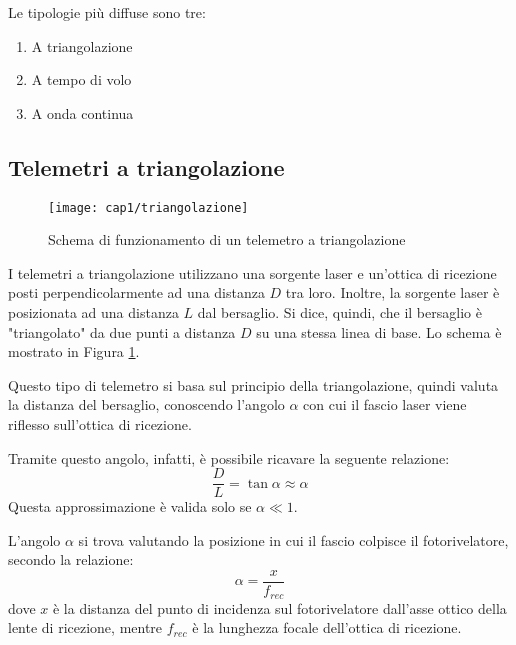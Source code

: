 Le tipologie più diffuse sono tre: 
\begin{enumerate}
	\item A triangolazione
	\item A tempo di volo
	\item A onda continua
\end{enumerate}

\subsection{Telemetri a triangolazione}
\begin{figure}[H]
  \begin{center}
    \texttt{[image: cap1/triangolazione]}
    \caption{Schema di funzionamento di un telemetro a triangolazione}
    \label{triangolazione}
  \end{center}
\end{figure}
I telemetri a triangolazione utilizzano una sorgente laser e un'ottica di ricezione posti perpendicolarmente ad una distanza $D$ tra loro. Inoltre, la sorgente laser è posizionata ad una distanza $L$ dal bersaglio. Si dice, quindi, che il bersaglio è "triangolato" da due punti a distanza $D$ su una stessa linea di base. Lo schema è mostrato in Figura \ref{triangolazione}.

Questo tipo di telemetro si basa sul principio della triangolazione, quindi valuta la distanza del bersaglio, conoscendo l'angolo $\alpha$ con cui il fascio laser viene riflesso sull'ottica di ricezione. 

Tramite questo angolo, infatti, è possibile ricavare la seguente relazione:
\begin{equation}
	\frac{D}{L}=\tan\alpha\approx\alpha
\end{equation}
Questa approssimazione è valida solo se $\alpha \ll 1$. 

L'angolo $\alpha$ si trova valutando la posizione in cui il fascio colpisce il fotorivelatore, secondo la relazione: 
\begin{equation}
  \alpha=\frac{x}{f_{rec}}
\end{equation}
dove $x$ è la distanza del punto di incidenza sul fotorivelatore dall'asse ottico della lente di ricezione, mentre $f_{rec}$ è la lunghezza focale dell'ottica di ricezione.

